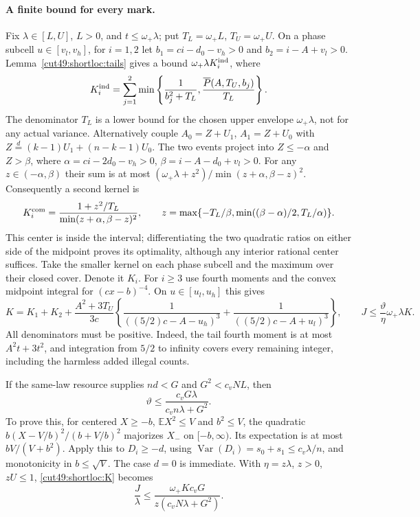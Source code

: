 \documentclass[11pt,a4paper]{article}
\numberwithin{equation}{section}
\theoremstyle{definition}
\theoremstyle{remark}
\begin{document}
\paragraph{A finite bound for every mark.}
Fix $\lambda\in[L,U]$, $L>0$, and $t\le\omega_+\lambda$; put
$T_L=\omega_+L$, $T_U=\omega_+U$. On a phase subcell $u\in[v_l,v_h]$,
for $i=1,2$ let $b_1=ci-d_0-v_h>0$ and $b_2=i-A+v_l>0$.
Lemma~\ref{cut49:shortloc:tails} gives a bound $\omega_+\lambda K_i^{\rm ind}$,
where
\[
 K_i^{\rm ind}=\sum_{j=1}^2\min\left\{\frac1{b_j^2+T_L},
                          \frac{\overline P(A,T_U,b_j)}{T_L}\right\}.
\]
The denominator $T_L$ is a lower bound for the chosen upper envelope
$\omega_+\lambda$, not for any actual variance.
Alternatively couple $A_0=Z+U_1$, $A_1=Z+U_0$ with
$Z\overset d=(k-1)U_1+(n-k-1)U_0$. The two events project into
$Z\le-\alpha$ and $Z>\beta$, where
$\alpha=ci-2d_0-v_h>0$, $\beta=i-A-d_0+v_l>0$.
For any $z\in(-\alpha,\beta)$ their sum is at most
$(\omega_+\lambda+z^2)/\min(z+\alpha,\beta-z)^2$.
Consequently a second kernel is
\[
 K_i^{\rm com}=\frac{1+z^2/T_L}{\min(z+\alpha,\beta-z)^2},\qquad
 z=\max\{-T_L/\beta,\min((\beta-\alpha)/2,T_L/\alpha)\}.
\]
This center is inside the interval; differentiating the two quadratic
ratios on either side of the midpoint proves its optimality, although
any interior rational center suffices. Take the smaller kernel on each
phase subcell and the maximum over their closed cover. Denote it $K_i$.
For $i\ge3$ use fourth moments and the convex midpoint integral for
$(cx-b)^{-4}$. On $u\in[u_l,u_h]$ this gives
\begin{equation}\label{cut49:shortloc:K}
 K=K_1+K_2+\frac{A^2+3T_U}{3c}
  \left\{\frac1{((5/2)c-A-u_h)^3}
                 +\frac1{((5/2)c-A+u_l)^3}\right\},\qquad
 J\le\frac{\vartheta}{\eta}\omega_+\lambda K.
\end{equation}
All denominators must be positive. Indeed, the tail fourth moment is at
most $A^2t+3t^2$, and integration from $5/2$ to infinity covers every
remaining integer, including the harmless added illegal counts.

If the same-law resource supplies $nd<G$ and
$G^2<c_vNL$, then
\begin{equation}\label{cut49:shortloc:theta}
 \vartheta\le\frac{c_vG\lambda}{c_vn\lambda+G^2}.
\end{equation}
To prove this, for centered $X\ge-b$, $\mathbb EX^2\le V$ and $b^2\le V$,
the quadratic $b(X-V/b)^2/(b+V/b)^2$ majorizes $X_-$ on $[-b,\infty)$.
Its expectation is at most $bV/(V+b^2)$. Apply this to $D_i\ge-d$,
using $\operatorname{Var}(D_i)=s_0+s_1\le c_v\lambda/n$, and monotonicity
in $b\le\sqrt V$. The case $d=0$ is immediate. With $\eta=z\lambda$,
$z>0$, $zU\le1$, \eqref{cut49:shortloc:K} becomes
\begin{equation}\label{cut49:shortloc:Jfinal}
 \frac J\lambda\le\frac{\omega_+Kc_vG}{z(c_vN\lambda+G^2)}.
\end{equation}
\end{document}
